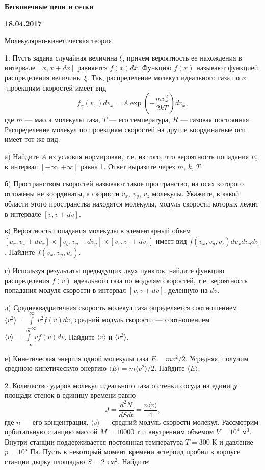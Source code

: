\documentclass[14pt]{article}
\begin{document}
\begin{center}
\Large{\textbf{Бесконечные цепи и сетки}}

\textbf{18.04.2017}

\vspace{5mm}
\end{center}
{\large{Молекулярно-кинетическая теория}}
\vspace{3mm}

1. Пусть задана случайная величина $\xi$, причем вероятность ее нахождения в интервале $[x,x+dx]$ равняется $f(x)dx$. Функцию $f(x)$ называют функцией распределения величины $\xi$. Так, распределение молекул идеального газа по $x$-проекциям скоростей имеет вид
$$
  f_x(v_x)dv_x=A\exp\left(-\frac{m v_x^2}{2kT}\right)dv_x,
$$
где $m$ --- масса молекулы газа, $T$ --- его температура, $R$ --- газовая постоянная. Распределение молекул по проекциям скоростей на другие координатные оси имеет тот же вид.

а) Найдите $A$ из условия нормировки, т.е. из того, что вероятность попадания $v_x$ в интервал $[-\infty,+\infty]$ равна 1. Ответ выразите через $m$, $k$, $T$.

б) Пространством скоростей называют такое пространство, на осях которого отложены не координаты, а скорости $v_x$, $v_y$, $v_z$ молекулы. Укажите, в какой области этого пространства находятся молекулы, модуль скорости которых лежит в интервале $[v,v+dv]$.

в) Вероятность попадания молекулы в элементарный объем $[v_x,v_x+dv_x]\times[v_y,v_y+dv_y]\times[v_z,v_z+dv_z]$ имеет вид $f(v_x,v_y,v_z)dv_x dv_y dv_z$. Найдите $f(v_x,v_y,v_z)$.

г) Используя результаты предыдущих двух пунктов, найдите функцию распределения $f(v)$ идеального газа по модулям скоростей, т.е. вероятность попадания модуля скорости в интервал $[v,v+dv]$, деленную на $dv$.

д) Среднеквадратичная скорость молекул газа определяется соотношением $\langle v^2 \rangle=\int\limits_{-\infty}^\infty v^2f(v)dv$, средний модуль скорости --- соотношением $\langle v \rangle=\int\limits_{-\infty}^\infty vf(v)dv$. Найдите $\langle v\rangle$ и $\langle v^2 \rangle$.

е) Кинетическая энергия одной молекулы газа $E=mv^2/2$. Усредняя, получим среднюю кинетическую энергию $\langle E \rangle=m\langle v^2\rangle/2$. Найдите $\langle E \rangle$.

2. Количество ударов молекул идеального газа о стенки сосуда на единицу площади стенок в единицу времени равно
$$
  J=\frac{d^2 N}{dSdt}=\frac{n\langle v\rangle}{4},
$$
где $n$ --- его концентрация, $\langle v\rangle$ --- средний модуль скорости молекул. Рассмотрим орбитальную станцию массой $M=10000$ т и внутренним объемом $V=10^4$ м$^3$. Внутри станции поддерживается постоянная температура $T=300$ К и давление $p=10^5$ Па. Пусть в некоторый момент времени астероид пробил в корпусе станции дырку площадью $S=2$ см$^2$. Найдите:
\end{document}
